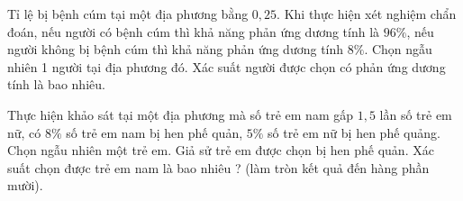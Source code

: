 \begin{bt}%
	Tỉ lệ bị bệnh cúm tại một địa phương bằng $0{,}25$. Khi thực hiện xét nghiệm chẩn đoán, nếu người có bệnh cúm thì khả năng  phản ứng dương tính là $96\%$, nếu người không bị bệnh cúm thì khả năng phản ứng dương tính $8\%$. Chọn ngẫu nhiên 1 người tại địa phương đó. Xác suất người được chọn có phản ứng dương tính là bao nhiêu.
\end{bt}

\begin{bt}%
	Thực hiện  khảo sát tại một địa phương mà số trẻ em nam gấp $1{,}5$ lần số trẻ em nữ, có $8\%$ số trẻ em nam bị hen phế quản, $5\%$ số trẻ em nữ bị hen phế quảng. Chọn ngẫu nhiên một trẻ em. Giả sử trẻ em được chọn bị hen phế quản. Xác suất chọn được trẻ em nam là bao nhiêu ? (làm tròn kết quả đến hàng phần mười).
\end{bt}

